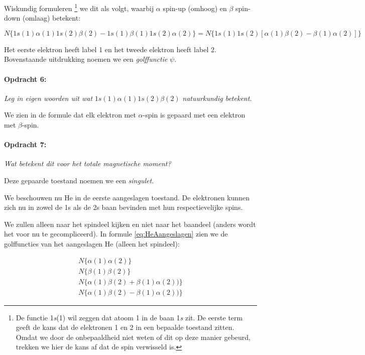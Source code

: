 Wiskundig formuleren \footnote{De functie 1\emph{s}(1) wil zeggen dat
atoom 1 in de baan 1\emph{s} zit. De eerste term geeft de kans dat de
elektronen 1 en 2 in een bepaalde toestand zitten. Omdat we door de
onbepaaldheid niet weten of dit op deze manier gebeurd, trekken we hier
de kans af dat de spin verwisseld is.} we dit als volgt, waarbij
$\alpha$ spin-up (omhoog) en $\beta$ spin-down (omlaag) betekent:

\begin{equation}
N\{1s(1)\alpha(1)1s(2)\beta(2)-1s(1)\beta(1)1s(2)\alpha(2)\}
=N\{1s(1)1s(2)[\alpha(1)\beta(2)-\beta(1)\alpha(2)]\}
\end{equation}


Het eerste elektron heeft label 1 en het tweede elektron heeft label
2. Bovenstaande uitdrukking noemen we een \emph{golffunctie} $\psi$.


\paragraph*{Opdracht 6:}

\emph{Leg in eigen woorden uit wat} $1s(1)\alpha(1)1s(2)\beta(2)$
\emph{natuurkundig betekent.}

We zien in de formule dat elk elektron met $\alpha$-spin is gepaard
met een elektron met $\beta$-spin.


\paragraph*{Opdracht 7:}

\emph{Wat betekent dit voor het totale magnetische moment?}

Deze gepaarde toestand noemen we een \emph{singulet}.

We beschouwen nu He in de eerste aangeslagen toestand. De elektronen
kunnen zich nu in zowel de 1s als de 2s baan bevinden met hun respectievelijke
spins.

We zullen alleen naar het spindeel kijken en niet naar het baandeel
(anders wordt het voor nu te gecompliceerd). In formule \ref{eq:HeAangeslagen}
zien we de golffuncties van het aangeslagen He (alleen het spindeel):

\begin{equation}
\begin{array}{c}
N\{\alpha(1)\alpha(2)\}\\
N\{\beta(1)\beta(2)\}\\
N\{\alpha(1)\beta(2)+\beta(1)\alpha(2))\}\\
N\{\alpha(1)\beta(2)-\beta(1)\alpha(2))\}
\end{array}\label{eq:HeAangeslagen}
\end{equation}



